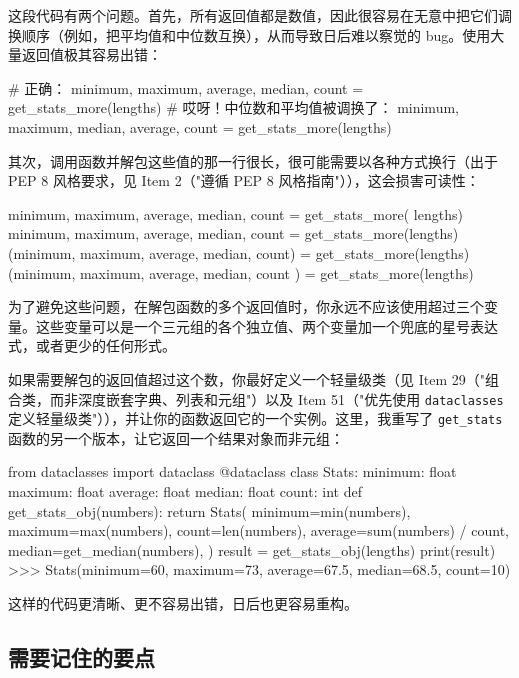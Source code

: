 这段代码有两个问题。首先，所有返回值都是数值，因此很容易在无意中把它们调换顺序（例如，把平均值和中位数互换），从而导致日后难以察觉的 bug。使用大量返回值极其容易出错：

\begin{codebox}[python]
# 正确：
minimum, maximum, average, median, count =
    get_stats_more(lengths)
# 哎呀！中位数和平均值被调换了：
minimum, maximum, median, average, count =
    get_stats_more(lengths)
\end{codebox}

其次，调用函数并解包这些值的那一行很长，很可能需要以各种方式换行（出于 PEP 8 风格要求，见 Item 2（"遵循 PEP 8 风格指南"）），这会损害可读性：

\begin{codebox}[python]
minimum, maximum, average, median, count = get_stats_more(
    lengths)
minimum, maximum, average, median, count =
    get_stats_more(lengths)
(minimum, maximum, average,
 median, count) = get_stats_more(lengths)
(minimum, maximum, average, median, count
    ) = get_stats_more(lengths)
\end{codebox}

为了避免这些问题，在解包函数的多个返回值时，你永远不应该使用超过三个变量。这些变量可以是一个三元组的各个独立值、两个变量加一个兜底的星号表达式，或者更少的任何形式。

如果需要解包的返回值超过这个数，你最好定义一个轻量级类（见 Item 29（"组合类，而非深度嵌套字典、列表和元组"）以及 Item 51（"优先使用 \texttt{dataclasses} 定义轻量级类"）），并让你的函数返回它的一个实例。这里，我重写了 \texttt{get\_stats} 函数的另一个版本，让它返回一个结果对象而非元组：

\begin{codebox}[python]
from dataclasses import dataclass
@dataclass
class Stats:
    minimum: float
    maximum: float
    average: float
    median: float
    count: int
def get_stats_obj(numbers):
    return Stats(
        minimum=min(numbers),
        maximum=max(numbers),
        count=len(numbers),
        average=sum(numbers) / count,
        median=get_median(numbers),
    )
result = get_stats_obj(lengths)
print(result)
>>>
Stats(minimum=60, maximum=73, average=67.5, median=68.5,
count=10)
\end{codebox}

这样的代码更清晰、更不容易出错，日后也更容易重构。

\subsection{需要记住的要点}

